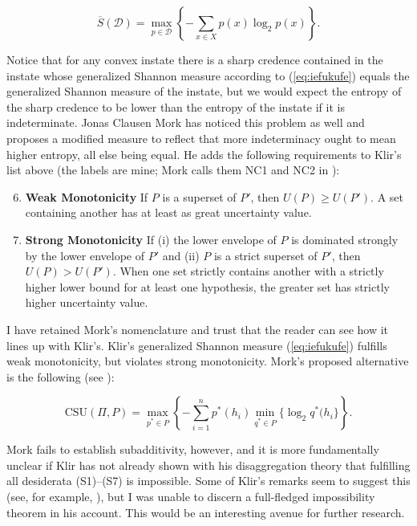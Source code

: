 \documentclass[phd,12pt,oneside]{ubcthesis}
\begin{document}
\begin{equation}
  \label{eq:iefukufe}
\overline{S}(\mathcal{D})=\max_{p\in\mathcal{D}}\left\{-\sum_{x\in{}X}p(x)\log_{2}p(x)\right\}.
\end{equation}

Notice that for any convex instate there is a sharp credence contained
in the instate whose generalized Shannon measure according to
(\ref{eq:iefukufe}) equals the generalized Shannon measure of the
instate, but we would expect the entropy of the sharp credence to be
lower than the entropy of the instate if it is indeterminate. Jonas
Clausen Mork has noticed this problem as well and proposes a modified
measure to reflect that more indeterminacy ought to mean higher
entropy, all else being equal. He adds the following requirements to
Klir's list above (the labels are mine; Mork calls them NC1 and NC2 in
):

\begin{enumerate}[(S1)]
\setcounter{enumi}{5}
\item \textbf{Weak Monotonicity} If $P$ is a superset of $P'$, then
  $U(P)\geq{}U(P')$. A set containing another has at least as great
  uncertainty value.
\item \textbf{Strong Monotonicity} If (i) the lower envelope of $P$ is
  dominated strongly by the lower envelope of $P'$ and (ii) $P$ is a
  strict superset of $P'$, then $U(P)>U(P')$. When one set strictly
  contains another with a strictly higher lower bound for at least one
  hypothesis, the greater set has strictly higher uncertainty value.
\end{enumerate}

I have retained Mork's nomenclature and trust that the reader can see
how it lines up with Klir's. Klir's generalized Shannon measure
(\ref{eq:iefukufe}) fulfills weak monotonicity, but violates strong
monotonicity. Mork's proposed alternative is
the following (see ):

\begin{equation}
  \label{eq:aeghapoo}
  \mbox{CSU}(\Pi,P)=\max_{p^{*}\in{}P}\left\{-\sum_{i=1}^{n}p^{*}(h_{i})\min_{q^{*}\in{}P}\{\log_{2}q^{*}(h_{i}\}\right\}.
\end{equation}

Mork fails to establish subadditivity, however, and it is more
fundamentally unclear if Klir has not already shown with his
disaggregation theory that fulfilling all desiderata (S1)--(S7) is
impossible. Some of Klir's remarks seem to suggest this (see, for
example, ), but I was unable to discern a
full-fledged impossibility theorem in his account. This would be an
interesting avenue for further research.
\end{document}
